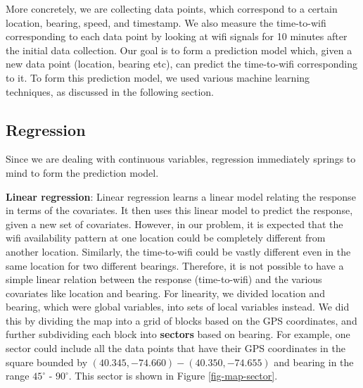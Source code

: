 \documentclass[12pt, fleqn]{article}
\begin{document}
More concretely, we are collecting data points, which correspond to a certain 
location, bearing, speed, and timestamp. We also measure the time-to-wifi 
corresponding to each data point by looking at wifi signals for 10 minutes after 
the initial data collection. Our goal is to form a prediction model which, 
given a new data point (location, bearing etc), can predict the time-to-wifi corresponding to it. 
To form this prediction model, we used various machine learning techniques, as 
discussed in the following section. 

\subsection{Regression}
\label{time-to-wifi-regression}

Since we are dealing with continuous variables, regression immediately springs 
to mind to form the prediction model. 

\textbf{Linear regression}: Linear regression learns a linear model relating the 
response in terms of the covariates. It then uses this linear model to predict 
the response, given a new set of covariates. However, in our problem, 
it is expected that the wifi availability pattern at one location
could be completely different from another location. Similarly, the time-to-wifi could be 
vastly different even in the same location for two different bearings. Therefore, 
it is not possible to have a simple linear relation between the response (time-to-wifi) and 
the various covariates like location and bearing. For linearity, we divided location and bearing,
which were global variables, into sets of local variables instead.
We did this by dividing the map into a grid of blocks based on the GPS coordinates, 
and further subdividing each block into \textbf{sectors} based on bearing. For example, one sector 
could include all the data points that have their GPS coordinates in the square bounded by 
$(40.345, -74.660) - (40.350, -74.655)$ and bearing in the range $45^\circ$ - $90^\circ$. This
sector is shown in Figure \ref{fig-map-sector}.
\end{document}
